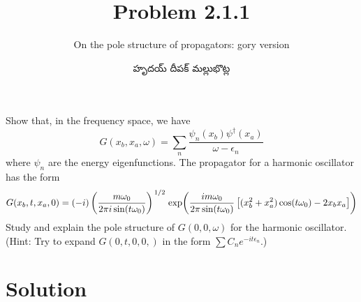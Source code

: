 \documentclass{article}
\title{Problem 2.1.1}
\subtitle{On the pole structure of propagators: gory version}
\author{\begin{telugu}హృదయ్ దీపక్ మల్లుభొట్ల\end{telugu}}
\date{}
\begin{document}
	\maketitle
	Show that, in the frequency space, we have
	\begin{equation}
		G(x_b, x_a, \omega) = \sum_n \frac{\psi_n(x_b) \psi^\dagger(x_a)}{\omega - \epsilon_n} \label{eq:target1}
	\end{equation}
	where $\psi_n$ are the energy eigenfunctions.
	The propagator for a harmonic oscillator has the form
	\begin{equation}
		G(x_b, t, x_a, 0) = (-i) \left( \frac{m \omega_0}{2 \pi i \sin(t \omega_0)} \right)^{\flatfrac12} \exp(\frac{i m \omega_0}{2 \pi \sin(t\omega_0)}\left[(x_b^2 + x_a^2)\cos(t \omega_0) - 2 x_b x_a \right]) \label{eq:harmonicoscprop}
	\end{equation}
	Study and explain the pole structure of $G(0, 0, \omega)$ for the harmonic oscillator.
	(Hint: Try to expand $G(0, t, 0, 0,)$ in the form $\sum C_n e^{-i t \epsilon_n}$.)

	\section{Solution} \label{sec:solution}
\end{document}

